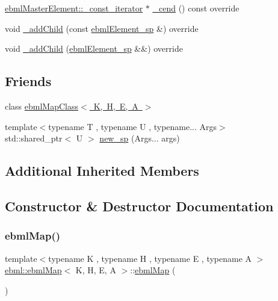 \begin{DoxyCompactItemize}
\item 
\mbox{\hyperlink{classebml_1_1ebmlMasterElement_1_1__const__iterator}{ebml\+Master\+Element\+::\+\_\+const\+\_\+iterator}} $\ast$ \mbox{\hyperlink{classebml_1_1ebmlMap_a2a667c679c5ba26d47d834a42921f988}{\+\_\+cend}} () const override
\item 
void \mbox{\hyperlink{classebml_1_1ebmlMap_a50fa3572f500363282894b7978b29464}{\+\_\+add\+Child}} (const \mbox{\hyperlink{namespaceebml_adad533b7705a16bb360fe56380c5e7be}{ebml\+Element\+\_\+sp}} \&) override
\item 
void \mbox{\hyperlink{classebml_1_1ebmlMap_ad3e1f23ca6bb1633c1982fb2cbabb39e}{\+\_\+add\+Child}} (\mbox{\hyperlink{namespaceebml_adad533b7705a16bb360fe56380c5e7be}{ebml\+Element\+\_\+sp}} \&\&) override
\end{DoxyCompactItemize}
\subsection*{Friends}
\begin{DoxyCompactItemize}
\item 
class \mbox{\hyperlink{classebml_1_1ebmlMap_a07a0de0d7e69f365ddabb5fbb0089698}{ebml\+Map\+Class$<$ K, H, E, A $>$}}
\item 
{\footnotesize template$<$typename T , typename U , typename... Args$>$ }\\std\+::shared\+\_\+ptr$<$ U $>$ \mbox{\hyperlink{classebml_1_1ebmlMap_ace404b6adc012cac5ccd9c03160456e3}{new\+\_\+sp}} (Args... args)
\end{DoxyCompactItemize}
\subsection*{Additional Inherited Members}


\subsection{Constructor \& Destructor Documentation}
\mbox{\label{classebml_1_1ebmlMap_ae96480e040d7541d32abddde92ab2b49}} 
\subsubsection{\texorpdfstring{ebml\+Map()}{ebmlMap()}}
{\footnotesize\ttfamily template$<$typename K , typename H , typename E , typename A $>$ \\
\mbox{\hyperlink{classebml_1_1ebmlMap}{ebml\+::ebml\+Map}}$<$ K, H, E, A $>$\+::\mbox{\hyperlink{classebml_1_1ebmlMap}{ebml\+Map}} (\begin{DoxyParamCaption}\item[{const \mbox{\hyperlink{classebml_1_1ebmlMapClass}{ebml\+Map\+Class}}$<$ K, H, E, A $>$ $\ast$}]{ }\end{DoxyParamCaption})\hspace{0.3cm}{\ttfamily [protected]}}



